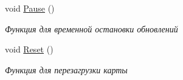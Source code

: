 \begin{DoxyCompactItemize}
void \hyperlink{classrtm_1_1_world_controller_a69bc1f11010c2ec18ed5afcde9ea2346}{Pause} ()
\begin{DoxyCompactList}\small\item\em Функция для временной остановки обновлений \end{DoxyCompactList}\item 
\mbox{\label{classrtm_1_1_world_controller_af682ce5179e826d1cc93f52f3c288905}} 
void \hyperlink{classrtm_1_1_world_controller_af682ce5179e826d1cc93f52f3c288905}{Reset} ()
\begin{DoxyCompactList}\small\item\em Функция для перезагрузки карты \end{DoxyCompactList}\end{DoxyCompactItemize}
